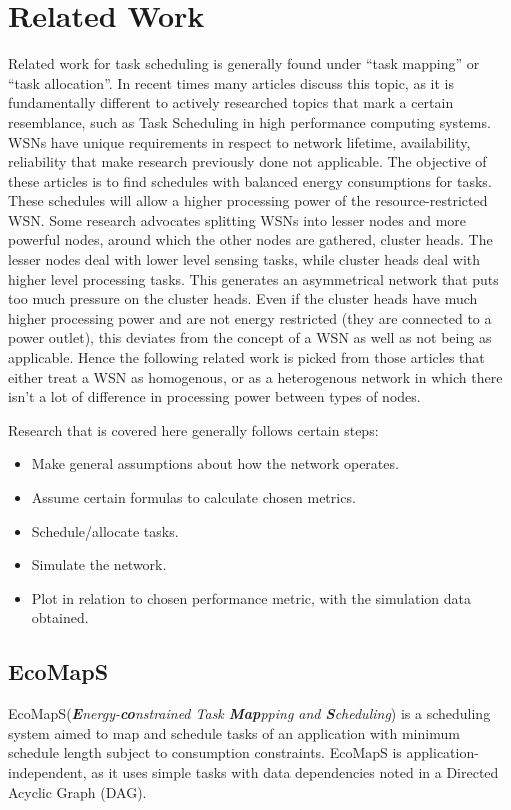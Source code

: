 \normalfont\normalsize
\chapter{Related Work}

Related work for task scheduling is generally found under ``task mapping'' or ``task allocation''. In recent times many articles discuss this topic,
as it is fundamentally different to actively researched topics that mark a certain resemblance, such as Task Scheduling in high performance 
computing systems. WSNs have unique requirements in respect to network lifetime, availability, reliability that make research previously done not 
applicable. The objective of these articles is to find schedules with balanced energy consumptions for tasks. These schedules will allow a higher
processing power of the resource-restricted WSN. Some research advocates splitting WSNs into lesser nodes and more powerful nodes, around which the other
nodes are gathered, cluster heads. The lesser nodes deal with lower level sensing tasks, while cluster heads deal with higher level processing tasks.
This generates an asymmetrical network that puts too much pressure on the cluster heads. Even if the cluster heads have much higher processing power and
are not energy restricted (they are connected to a power outlet), this deviates from the concept of a WSN as well as not being as applicable.
Hence the following related work is picked from those articles that either treat a WSN as homogenous, or as a heterogenous network in which there isn't
a lot of difference in processing power between types of nodes.

 Research that is covered here generally follows certain steps: 
\begin{itemize}
 \item Make general assumptions about how the network operates.
 \item Assume certain formulas to calculate chosen metrics.
 \item Schedule/allocate tasks.
 \item Simulate the network.
 \item Plot in relation to chosen performance metric, with the simulation data obtained.
 
\end{itemize}

\section{EcoMapS}
EcoMapS({\itshape \textbf{E}nergy-\textbf{co}nstrained Task \textbf{Map}pping and \textbf{S}cheduling}) is a scheduling system aimed to map and 
schedule tasks of an application with minimum schedule length subject to consumption constraints\cite{Yuan2007}. EcoMapS is application-independent, as it 
uses simple tasks with data dependencies noted in a Directed Acyclic Graph (DAG). 

